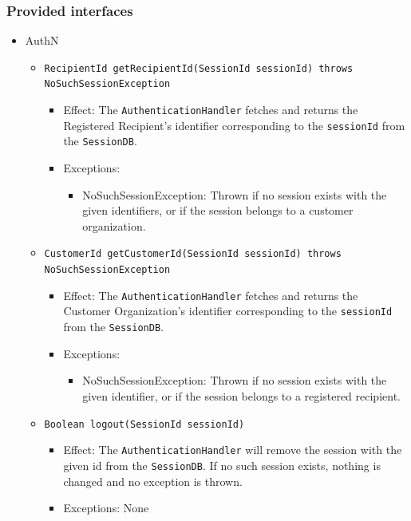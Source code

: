\documentclass[a4paper,10pt]{article}
\begin{document}
\subsubsection*{Provided interfaces}
\begin{itemize}
    \item AuthN
    \begin{itemize}
        \item \texttt{RecipientId getRecipientId(SessionId sessionId) throws NoSuchSessionException}
        \begin{itemize}
            \item Effect: The \texttt{AuthenticationHandler} fetches and returns the Registered Recipient's identifier corresponding to the \texttt{sessionId} from the \texttt{SessionDB}.
            \item Exceptions:
            \begin{itemize}
                \item NoSuchSessionException: Thrown if no session exists with the given identifiers, or if the session belongs to a customer organization.
            \end{itemize}
		\end{itemize}
		
        \item \texttt{CustomerId getCustomerId(SessionId sessionId) throws NoSuchSessionException}
        \begin{itemize}
             \item Effect: The \texttt{AuthenticationHandler} fetches and returns the Customer Organization's identifier corresponding to the \texttt{sessionId} from the \texttt{SessionDB}.
             \item Exceptions:
             \begin{itemize}
                \item NoSuchSessionException: Thrown if no session exists with the given identifier, or if the session belongs to a registered recipient.
             \end{itemize}
        \end{itemize}
        
        \item \texttt{Boolean logout(SessionId sessionId)}
        \begin{itemize}
            \item Effect: The \texttt{AuthenticationHandler} will remove the session with the given id from the \texttt{SessionDB}. If no such session exists, nothing is changed and no exception is thrown.
            \item Exceptions: None
        \end{itemize}
        

\end{itemize}
\end{itemize}
\end{document}
